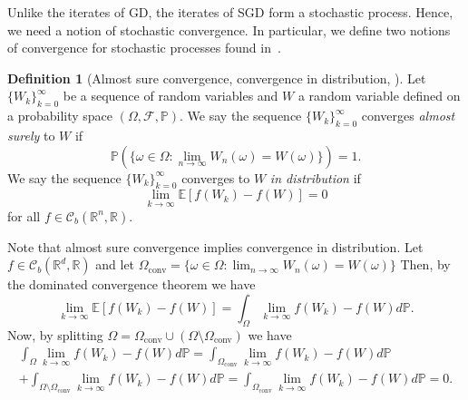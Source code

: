 \documentclass[12pt]{article}
\theoremstyle{definition}
\newtheorem{definition}[definition]{Definition}
\numberwithin{equation}{section}
\newcommand{\R}{\mathbb{R}}
\newcommand{\BP}{\mathbb{P}}
\newcommand{\CF}{\mathcal{F}}
\newcommand{\CC}{\mathcal{C}}
\newcommand{\ev}[1]{\mathbb{E}\left[{#1}\right]}
\begin{document}
Unlike the iterates of GD, the iterates of SGD form a stochastic process. Hence, we need a notion of stochastic convergence. In particular, we define two notions of convergence for stochastic processes found in~\autocite{eAppliedStochasticAnalysis2021}.

\begin{definition}[Almost sure convergence, convergence in distribution, ]
Let $\{W_k\}_{k=0}^{\infty}$ be a sequence of random variables and $W$ a random variable defined on a probability space $(\Omega, \CF, \BP)$. We say the sequence $\{W_k\}_{k=0}^{\infty}$ converges \emph{almost surely} to $W$ if
\begin{equation*}
  \BP(\{\omega \in \Omega : \lim_{n \rightarrow \infty}W_n(\omega) = W(\omega)\}) = 1.
\end{equation*}
We say the sequence  $\{W_k\}_{k=0}^{\infty}$ converges to $W$ \emph{in distribution} if
  \begin{equation*}
    \lim_{k \rightarrow \infty}\ev{f(W_k) - f(W)} = 0
  \end{equation*}
  for all $f \in \CC_b(\R^n, \R)$.
\end{definition}
Note that almost sure convergence implies convergence in distribution. Let $f \in \CC_b(\R^d, \R)$ and let $\Omega_{\text{conv}} = \{\omega \in \Omega : \lim_{n \rightarrow \infty}W_n(\omega) = W(\omega)\}$ Then, by the dominated convergence theorem we have 
\begin{equation*}
  \lim_{k \rightarrow \infty} \ev{f(W_k) - f(W)} = \int_{\Omega} \lim_{k \rightarrow \infty} f(W_k) - f(W) d\BP.
\end{equation*}
Now, by splitting $\Omega = \Omega_{\text{conv}} \cup (\Omega \setminus \Omega_{\text{conv}})$ we have
\begin{multline*}
  \int_{\Omega} \lim_{k \rightarrow \infty} f(W_k) - f(W) d\BP 
  =\int_{\Omega_{\text{conv}}} \lim_{k \rightarrow \infty} f(W_k) - f(W) d\BP \\
   + \int_{\Omega \setminus \Omega_{\text{conv}}} \lim_{k \rightarrow \infty} f(W_k) - f(W) d\BP = \int_{\Omega_{\text{conv}}} \lim_{k \rightarrow \infty} f(W_k) - f(W) d\BP = 0.
\end{multline*}
\end{document}
